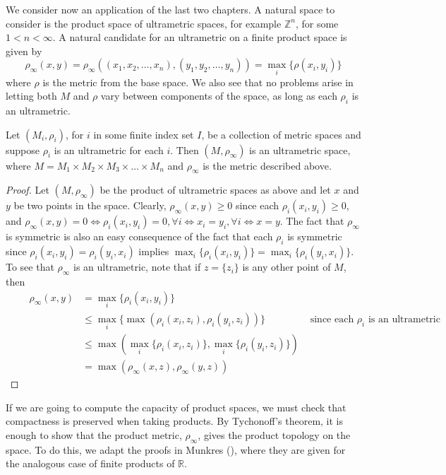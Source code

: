 We consider now an application of the last two chapters. A natural space to consider is the product space of ultrametric spaces, for example $\mathbb{Z}^n$, for some $1 < n < \infty$. A natural candidate for an ultrametric on a finite product space is given by
\[ \rho_\infty(x,y) = \rho_\infty((x_1,x_2,\ldots,x_n),(y_1,y_2, \ldots, y_n)) = \max_{i} \{\rho(x_i, y_i)\}\] where $\rho$ is the metric from the base space.  We also see that no problems arise in letting both $M$ and $\rho$ vary between components of the space, as long as each $\rho_i$ is an ultrametric.

\begin{proposition}
Let $(M_i, \rho_i)$, for $i$ in some finite index set $I$, be a collection of metric spaces and suppose $\rho_i$ is an ultrametric for each $i$. Then $(M,\rho_\infty)$ is an ultrametric space, where $M=M_1 \times M_2 \times M_3 \times \ldots \times M_n$ and $\rho_\infty$ is the metric described above.
\end{proposition}

\begin{proof}
Let $(M, \rho_\infty)$ be the product of ultrametric spaces as above and let $x$ and $y$ be two points in the space. Clearly, $\rho_\infty(x,y) \geq 0$ since each $\rho_i(x_i,y_i) \geq 0$, and $\rho_\infty(x,y) = 0 \iff \rho_i(x_i,y_i) =0,\forall i \iff x_i=y_i, \forall i \iff x=y$. The fact that $\rho_\infty$ is symmetric is also an easy consequence of the fact that each $\rho_i$ is symmetric since  $\rho_i(x_i, y_i) = \rho_i(y_i, x_i)$ implies $\max_{i}\{\rho_i(x_i, y_i)\} = \max_i\{\rho_i(y_i, x_i)\}$. To see that $\rho_\infty$ is an ultrametric, note that if $z=\{z_i\}$ is any other point of $M$, then
\begin{align*}
   \qquad \rho_\infty(x, y)& = \max_i\{\rho_i(x_i,y_i)\}  \\
    &\leq \max_i\{\max(\rho_i(x_i,z_i),\rho_i(y_i,z_i))\} & \text{ since each $\rho_i$ is an ultrametric } \\
    &\leq \max(\max_i\{\rho_i(x_i,z_i)\}, \max_i\{\rho_i(y_i,z_i)\})  \\
    &= \max(\rho_\infty(x,z),\rho_\infty(y,z))  
\end{align*}
\end{proof}

If we are going to compute the capacity of product spaces, we must check that compactness is preserved when taking products. By Tychonoff's theorem, it is enough to show that the product metric, $\rho_\infty$, gives the product topology on the space. To do this, we adapt the proofs in Munkres (\cite{mun}), where they are given for the analogous case of finite products of $\mathbb{R}$.\\

